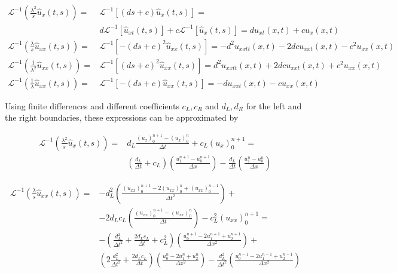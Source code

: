 \begin{equation}
	\begin{aligned}
    \mathcal{L}^{-1} \left( \frac{\lambda^2}{s} \hat{u}_x(t,s) \right) = & \mathcal{L}^{-1} \left[ (ds+c) \hat{u}_x(t,s) \right] = \\
    			 & d\mathcal{L}^{-1} \left[ \hat{u}_{xt}(t,s) \right] + c \mathcal{L}^{-1} \left[ \hat{u}_{x}(t,s) \right] =   du_{xt}(x,t) + cu_x(x,t) \\
    \mathcal{L}^{-1} \left( \frac{\lambda}{s} \hat{u}_{xx}(t,s) \right) = & \mathcal{L}^{-1} \left[ -(ds+c)^2 \hat{u}_{xx}(t,s) \right] =  -d^2u_{xxtt}(x,t) -2dcu_{xxt}(x,t) - c^2u_{xx}(x,t) \\
    \mathcal{L}^{-1} \left( \frac{1}{\lambda^2} \hat{u}_{xx}(t,s) \right) = & \mathcal{L}^{-1} \left[ (ds+c)^2 \hat{u}_{xx}(t,s) \right] =d^2u_{xxtt}(x,t) + 2dcu_{xxt}(x,t) + c^2u_{xx}(x,t) \\
    \mathcal{L}^{-1} \left( \frac{1}{\lambda} \hat{u}_{xx}(t,s) \right) = & \mathcal{L}^{-1} \left[ -(ds+c) \hat{u}_{xx}(t,s) \right] = -du_{xxt}(x,t) - cu_{xx}(x,t)
    \end{aligned}
\end{equation}

\indent Using finite differences and different coefficients $c_L,c_R$ and $d_L,d_R$ for the left and the right boundaries, these expressions can be approximated by

\begin{equation}
    \label{eq:FDorder2A}
    \begin{aligned}
    \mathcal{L}^{-1} \left( \frac{\lambda^2}{s} \hat{u}_x(t,s) \right) = & d_L \frac{ (u_x)_0^{n+1} - (u_x)_0^n}{\Delta t} + c_L (u_x)_0^{n+1} = \\
    			& \left( \frac{d_L}{\Delta t} + c_L \right) \left( \frac{u_1^{n+1} - u_0^{n+1}}{\Delta x}\right) - \frac{d_L}{\Delta t} \left( \frac{u_1^{n} - u_0^{n}}{\Delta x}\right)
    \end{aligned}
 \end{equation}
 
 \begin{equation}
     \label{eq:FDorder2B}
    \begin{aligned}
    \mathcal{L}^{-1} \left( \frac{\lambda}{s} \hat{u}_{xx}(t,s) \right) = & -d_L^2 \left( \frac{(u_{xx})_0^{n+1} - 2(u_{xx})_0^{n} + (u_{xx})_0^{n-1}}{\Delta t^2} \right) + \\
    			&  - 2d_Lc_L \left( \frac{(u_{xx})_0^{n+1} - (u_{xx})_0^{n}}{\Delta t} \right) - c_L^2 (u_{xx})_0^{n+1} = \\
    			& -\left( \frac{d_L^2}{\Delta t^2} + \frac{2d_Lc_L}{\Delta t} + c_L^2  \right) \left(  \frac{u_0^{n+1} - 2u_1^{n+1} + u_2^{n+1}}{\Delta x^2} \right) + \\
    			& \left( 2\frac{d_L^2}{\Delta t^2} + \frac{2d_Lc_L}{\Delta t}\right) \left(  \frac{u_0^{n} - 2u_1^n + u_2^{n}}{\Delta x^2} \right) - \frac{d_L^2}{\Delta t^2} \left(  \frac{u_0^{n-1} - 2u_1^{n-1} + u_2^{n-1}}{\Delta x^2} \right)
    \end{aligned}
 \end{equation}
     			
